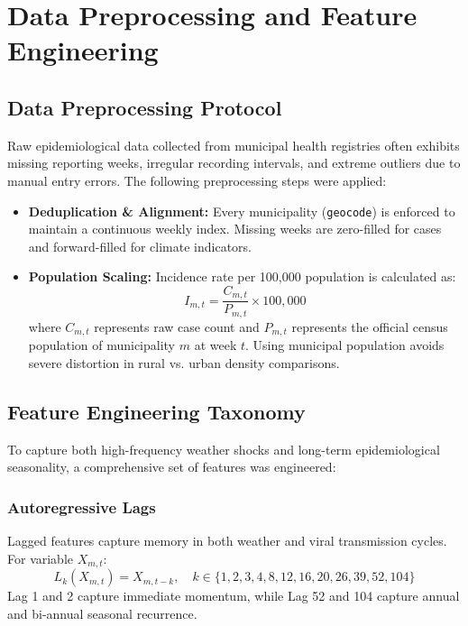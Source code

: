 \documentclass[journal,onecolumn,11pt]{IEEEtran}
\begin{document}
\section{Data Preprocessing and Feature Engineering}

\subsection{Data Preprocessing Protocol}
Raw epidemiological data collected from municipal health registries often exhibits missing reporting weeks, irregular recording intervals, and extreme outliers due to manual entry errors. The following preprocessing steps were applied:
\begin{itemize}
    \item \textbf{Deduplication \& Alignment:} Every municipality (\texttt{geocode}) is enforced to maintain a continuous weekly index. Missing weeks are zero-filled for cases and forward-filled for climate indicators.
    \item \textbf{Population Scaling:} Incidence rate per 100,000 population is calculated as:
    \begin{equation}
        I_{m,t} = \frac{C_{m,t}}{P_{m,t}} \times 100,000
    \end{equation}
    where $C_{m,t}$ represents raw case count and $P_{m,t}$ represents the official census population of municipality $m$ at week $t$. Using municipal population avoids severe distortion in rural vs. urban density comparisons.
\end{itemize}

\subsection{Feature Engineering Taxonomy}
To capture both high-frequency weather shocks and long-term epidemiological seasonality, a comprehensive set of features was engineered:

\subsubsection{Autoregressive Lags}
Lagged features capture memory in both weather and viral transmission cycles. For variable $X_{m,t}$:
\begin{equation}
    L_k(X_{m,t}) = X_{m,t-k}, \quad k \in \{1, 2, 3, 4, 8, 12, 16, 20, 26, 39, 52, 104\}
\end{equation}
Lag 1 and 2 capture immediate momentum, while Lag 52 and 104 capture annual and bi-annual seasonal recurrence.
\end{document}
